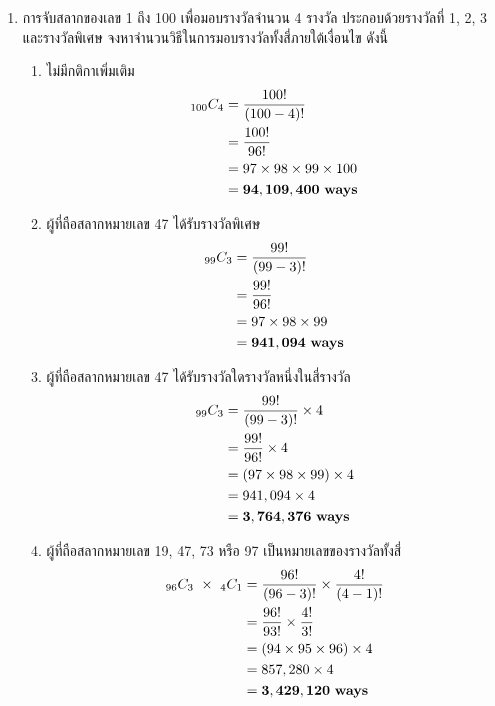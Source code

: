 \documentclass{article}
\begin{document}
\begin{enumerate}
	\item การจับสลากของเลข 1 ถึง 100 เพื่อมอบรางวัลจำนวน 4 รางวัล ประกอบด้วยรางวัลที่ 1, 2, 3 และรางวัลพิเศษ\newline
	จงหาจำนวนวิธีในการมอบรางวัลทั้งสี่ภายใต้เงื่อนไข ดังนี้
	\begin{enumerate}
		\item ไม่มีกติกาเพิ่มเติม
		\begin{equation}
		\begin{split}
		_{100}C_{4} &= \frac{100!}{(100 - 4)!} \notag\\
		&= \frac{100!}{96!} \\
		&= 97 \times 98 \times 99 \times 100 \\
		&=  \mathbf{94,109,400~ways}
		\end{split}
		\end{equation}
		
		\item ผู้ที่ถือสลากหมายเลข 47 ได้รับรางวัลพิเศษ
		\begin{equation}
		\begin{split}
		_{99}C_{3} &= \frac{99!}{(99 - 3)!} \notag \\
		&= \frac{99!}{96!} \\
		&= 97 \times 98 \times 99 \\
		&=  \mathbf{941,094~ways}
		\end{split}
		\end{equation}
		
		\item ผู้ที่ถือสลากหมายเลข 47 ได้รับรางวัลใดรางวัลหนึ่งในสี่รางวัล
		\begin{equation}
		\begin{split}
		_{99}C_{3} &= \frac{99!}{(99 - 3)!} \times 4 \notag \\
		&= \frac{99!}{96!} \times 4 \\
		&= (97 \times 98 \times 99) \times 4 \\
		&= 941,094 \times 4 \\
		&=  \mathbf{3,764,376~ways}
		\end{split}
		\end{equation}
		
\pagebreak
		
		\item ผู้ที่ถือสลากหมายเลข 19, 47, 73 หรือ 97 เป็นหมายเลขของรางวัลทั้งสี่
		\begin{equation}
		\begin{split}
		_{96}C_{3} ~\times~ _{4}C_{1} &= \frac{96!}{(96 - 3)!} \times \frac{4!}{(4 - 1)!} \notag \\
		&= \frac{96!}{93!} \times \frac{4!}{3!} \\
		&= (94 \times 95 \times 96) \times 4 \\
		&= 857,280 \times 4 \\
		&=  \mathbf{3,429,120~ways}
		\end{split}
		\end{equation}
	\end{enumerate}
	

\end{enumerate}
\end{document}

